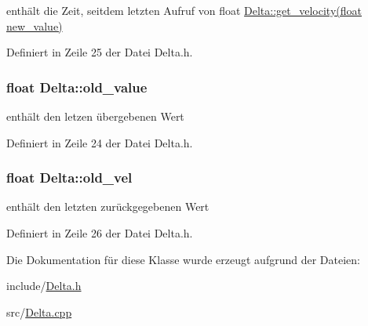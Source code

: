 enthält die Zeit, seitdem letzten Aufruf von float \hyperlink{class_delta_a16d1cf25743928796d7cf1e5c7882c17}{Delta::get\_\-velocity(float new\_\-value)} 



Definiert in Zeile 25 der Datei Delta.h.

\hypertarget{class_delta_a1724264763801016d7d1c0d5f4817a96}{
\subsubsection[{old\_\-value}]{\setlength{\rightskip}{0pt plus 5cm}float {\bf Delta::old\_\-value}}}
\label{class_delta_a1724264763801016d7d1c0d5f4817a96}


enthält den letzen übergebenen Wert 



Definiert in Zeile 24 der Datei Delta.h.

\hypertarget{class_delta_a479029e6db0f2738547961f0d72bec78}{
\subsubsection[{old\_\-vel}]{\setlength{\rightskip}{0pt plus 5cm}float {\bf Delta::old\_\-vel}}}
\label{class_delta_a479029e6db0f2738547961f0d72bec78}


enthält den letzten zurückgegebenen Wert 



Definiert in Zeile 26 der Datei Delta.h.



Die Dokumentation für diese Klasse wurde erzeugt aufgrund der Dateien:\begin{DoxyCompactItemize}
\item 
include/\hyperlink{_delta_8h}{Delta.h}\item 
src/\hyperlink{_delta_8cpp}{Delta.cpp}\end{DoxyCompactItemize}
